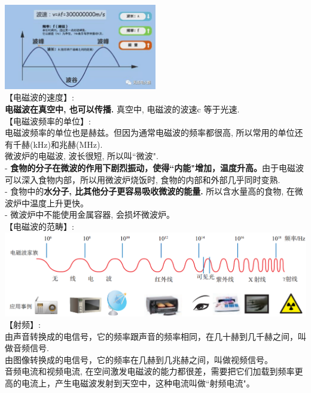 \documentclass[UTF8]{ctexart}
\begin{document}
		\includegraphics[width=0.5\textwidth]{img/0101.jpg} \\		
		
		
		【电磁波的速度】:\\
		\textbf{电磁波在真空中, 也可以传播.} 真空中, 电磁波的波速c 等于光速. \\
		
		【电磁波频率的单位】:\\
		电磁波频率的单位也是赫兹。但因为通常电磁波的频率都很高, 所以常用的单位还有千赫(kHz)和兆赫(MHz). \\
		
		微波炉的电磁波, 波长很短, 所以叫``微波". \\
		- \textbf{食物的分子在微波的作用下剧烈振动，使得``内能"增加，温度升高。}由于电磁波可以深入食物内部，所以用微波炉烧饭时, 食物的内部和外部几乎同时变熟.	\\
		- 食物中的\textbf{水分子, 比其他分子更容易吸收微波的能量.} 所以含水量高的食物, 在微波炉中温度上升更快。 \\
		- 微波炉中不能使用金属容器, 会损坏微波炉。\\			
		
		
		【电磁波的范畴】:\\
\includegraphics[width=1\textwidth]{img/0102.png}		\\


		【射频】:\\
		由声音转换成的电信号，它的频率跟声音的频率相同，在几十赫到几千赫之间，叫做音频信号. \\
		由图像转换成的电信号，它的频率在几赫到几兆赫之间，叫做视频信号。\\
		音频电流和视频电流, 在空间激发电磁波的能力都很差，需要把它们加载到频率更高的电流上，产生电磁波发射到天空中，这种电流叫做``射频电流"。 \\
		
\end{document}
